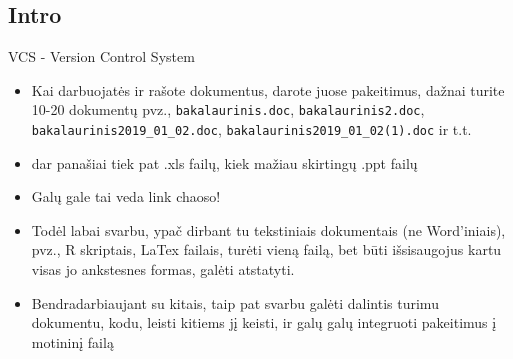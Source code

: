 \documentclass[11pt,xcolor=table]{beamer}
\begin{document}
\subsection{Intro}
\begin{frame}{VCS - Version Control System}
\begin{itemize}
\item Kai darbuojatės ir rašote dokumentus, darote juose pakeitimus, dažnai turite 10-20 dokumentų pvz., \colorbox{listinggray}{\lstinline|bakalaurinis.doc|}, \colorbox{listinggray}{\lstinline|bakalaurinis2.doc|}, \colorbox{listinggray}{\lstinline|bakalaurinis2019_01_02.doc|}, \colorbox{listinggray}{\lstinline|bakalaurinis2019_01_02(1).doc|} ir t.t. 
\item dar panašiai tiek pat .xls failų, kiek mažiau skirtingų .ppt failų
\item Galų gale tai veda link chaoso!
\item Todėl labai svarbu, ypač dirbant tu tekstiniais dokumentais (ne Word'iniais), pvz., R skriptais, LaTex failais, turėti vieną failą, bet būti išsisaugojus kartu visas jo ankstesnes formas, galėti atstatyti.
\item Bendradarbiaujant su kitais, taip pat svarbu galėti dalintis turimu dokumentu, kodu, leisti kitiems jį keisti, ir galų galų integruoti pakeitimus į motininį failą
\end{itemize}
\end{frame}
\end{document}
